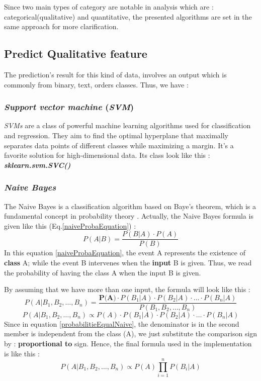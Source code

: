 \documentclass[12pt,a4paper]{report}
\begin{document}
Since two main types of category are notable in analysis which are : categorical(qualitative) and quantitative, the presented algorithms are set in the same approach for more clarification.

\subsection{Predict Qualitative feature} 
The prediction's result for this kind of data, involves an output which is commonly from binary, text, orders classes. Thus, we have : 
\subsubsection{\textit{Support vector machine} (\textit{SVM})} 
\textit{SVMs} are a class of powerful machine learning algorithms used for classification and regression. They aim to find the optimal hyperplane that maximally separates data points of different classes while maximizing a margin. It's a favorite solution for high-dimensional data\cite{memoireUniversitySpam}. Its class look like this : \textbf{\textit{sklearn.svm.SVC()}}

\subsubsection{\textit{Naive Bayes}} 
The Naive Bayes is a classification algorithm based on Baye's theorem, which is a fundamental concept in probability theory \cite{maria2016performance}. 
Actually, the Naive Bayes formula is given like this (Eq.\ref{naiveProbaEquation}) : 
\begin{equation}
	\label{naiveProbaEquation}
	P(A|B) = \frac{P(B|A)  \cdot  P(A)}{P(B)}
\end{equation}
In this equation \ref{naiveProbaEquation}, the event A represents the existence of \textbf{class} A; while the event B intervenes when the \textbf{input} B is given. Thus, we read the probability of having the class A when the input B is given. 

\noindent By assuming that we have more than one input, the formula will look like this : 
\begin{equation} 
	\label{probabilitieEqualNaive}
	P(A | B_1, B_2, \ldots, B_n) = \frac{\textbf{P(A)} \cdot P(B_1 | A) \cdot P(B_2 | A) \cdot \ldots \cdot P(B_n | A)}{P(B_1, B_2, \ldots, B_n)}
\end{equation}  
\begin{equation}
	P(A | B_1, B_2, \ldots, B_n) \propto P(A) \cdot P(B_1 | A) \cdot P(B_2 | A) \cdot \ldots \cdot P(B_n | A)
\end{equation}
Since in equation \ref{probabilitieEqualNaive}, the denominator is in the second member is independent from the class (A), we just substitute the comparison sign by : \textbf{proportional to} sign. Hence, the final formula used in the implementation is like this :
\begin{equation}
P(A | B_1, B_2, \ldots, B_n) \propto P(A) \prod_{i=1}^{n} P(B_i | A)
\end{equation}
\end{document}

